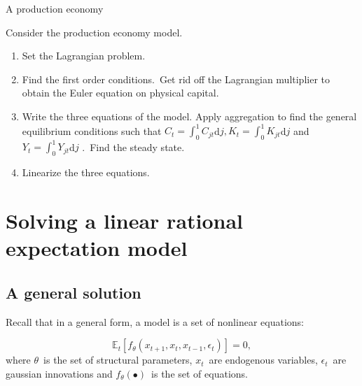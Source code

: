 \documentclass[a4paper,12pt]{article}%
\begin{document}
\begin{myexercise}{A production economy}
%


Consider the production economy model.

\begin{enumerate}
\item Set the Lagrangian problem.

\item Find the first order conditions.\ Get rid off the Lagrangian multiplier
to obtain the Euler equation on physical capital.

\item Write the three equations of the model. Apply aggregation to find the
general equilibrium conditions such that $C_{t}=%
{\textstyle\int\nolimits_{0}^{1}}
C_{jt}$d$j,K_{t}=%
{\textstyle\int\nolimits_{0}^{1}}
K_{jt}$d$j$ and $Y_{t}=%
{\textstyle\int\nolimits_{0}^{1}}
Y_{jt}$d$j$ .\ Find the steady state.

\item Linearize the three equations.
\end{enumerate}

%

\end{myexercise}%


\section{Solving a linear rational expectation model}

\subsection{A general solution}

Recall that in a general form, a model is a set of nonlinear equations:%

\begin{equation}
\mathbb{E}_{t}\left[  f_{\theta}\left(  x_{t+1},x_{t},x_{t-1},\epsilon
_{t}\right)  \right]  =0, \label{eq non linear system}%
\end{equation}
where $\theta$\ is the set of structural parameters, $x_{t}$\ are endogenous
variables, $\epsilon_{t}$\ are gaussian innovations and $f_{\theta}(\bullet
)$\ is the set of equations.
\end{document}
